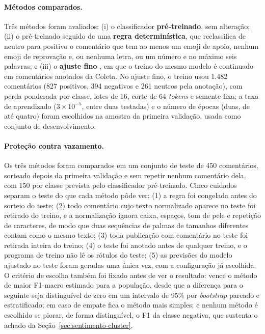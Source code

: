 \paragraph*{Métodos comparados.} Três métodos foram avaliados: (i) o classificador \textbf{pré-treinado}, sem alteração; (ii) o pré-treinado seguido de uma \textbf{regra determinística}, que reclassifica de neutro para positivo o comentário que tem ao menos um emoji de apoio, nenhum emoji de reprovação e, ou nenhuma letra, ou um número e no máximo seis palavras; e (iii) o \textbf{ajuste fino} \cite{devlin2019}, em que o treino do mesmo modelo é continuado em comentários anotados da Coleta. No ajuste fino, o treino usou 1.482 comentários (827 positivos, 394 negativos e 261 neutros pela anotação), com perda ponderada por classe, lotes de 16, corte de 64 \emph{tokens} e semente fixa; a taxa de aprendizado ($3\times10^{-5}$, entre duas testadas) e o número de épocas (duas, de até quatro) foram escolhidos na amostra da primeira validação, usada como conjunto de desenvolvimento.

\paragraph*{Proteção contra vazamento.} Os três métodos foram comparados em um conjunto de teste de 450 comentários, sorteado depois da primeira validação e sem repetir nenhum comentário dela, com 150 por classe prevista pelo classificador pré-treinado. Cinco cuidados separam o teste do que cada método pôde ver: (1) a regra foi congelada antes do sorteio do teste; (2) todo comentário cujo texto normalizado aparece no teste foi retirado do treino, e a normalização ignora caixa, espaços, tom de pele e repetição de caracteres, de modo que duas sequências de palmas de tamanhos diferentes contam como o mesmo texto; (3) toda publicação com comentário no teste foi retirada inteira do treino; (4) o teste foi anotado antes de qualquer treino, e o programa de treino não lê os rótulos do teste; (5) as previsões do modelo ajustado no teste foram geradas uma única vez, com a configuração já escolhida. O critério de escolha também foi fixado antes de ver o resultado: vence o método de maior F1-macro estimado para a população, desde que a diferença para o seguinte seja distinguível de zero em um intervalo de 95\% por \emph{bootstrap} \cite{efron1979} pareado e estratificado; em caso de empate fica o método mais simples; e nenhum método é escolhido se piorar, de forma distinguível, o F1 da classe negativa, que sustenta o achado da Seção~\ref{sec:sentimento-cluster}.


